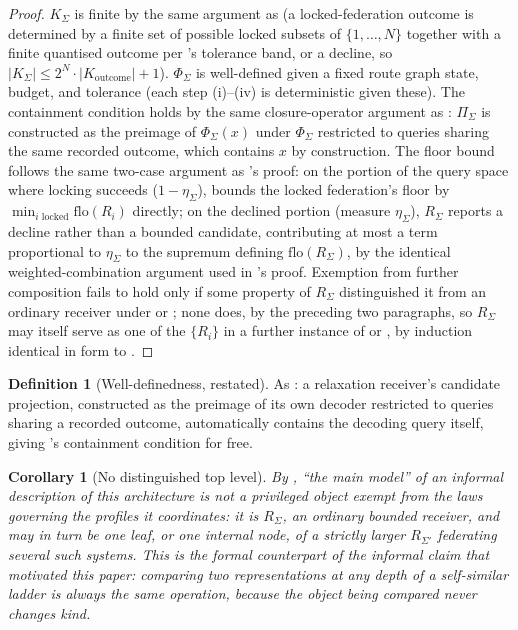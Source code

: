 \documentclass[11pt,twocolumn,a4paper]{article}
\theoremstyle{rdm}
\newtheorem{corollary}[theorem]{Corollary}
\theoremstyle{definition}
\newtheorem{definition}[theorem]{Definition}
\theoremstyle{remark}
\newcommand{\Know}{K}
\newcommand{\flo}{\mathrm{flo}}
\newcommand{\Rec}{R}
\begin{document}
\begin{proof}
$\Know_\Sigma$ is finite by the same argument as
 (a locked-federation outcome is determined by a
finite set of possible locked subsets of $\{1,\dots,N\}$ together with a
finite quantised outcome per 's tolerance band,
or a decline, so $|\Know_\Sigma|\le 2^N\cdot|\Know_{\mathrm{outcome}}|+1$).
$\Phi_\Sigma$ is well-defined given a fixed route graph state, budget, and
tolerance (each step (i)--(iv) is deterministic given these). The
containment condition holds by the same closure-operator argument as
: $\Pi_\Sigma$ is constructed as the preimage
of $\Phi_\Sigma(x)$ under $\Phi_\Sigma$ restricted to queries sharing the
same recorded outcome, which contains $x$ by construction. The floor bound
follows the same two-case argument as 's proof:
on the portion of the query space where locking succeeds
($1-\eta_\Sigma$),  bounds the locked
federation's floor by $\min_{i\text{ locked}}\flo(\Rec_i)$ directly; on the
declined portion (measure $\eta_\Sigma$), $\Rec_\Sigma$ reports a decline
rather than a bounded candidate, contributing at most a term proportional
to $\eta_\Sigma$ to the supremum defining $\flo(\Rec_\Sigma)$, by the
identical weighted-combination argument used in
's proof. Exemption from further composition
fails to hold only if some property of $\Rec_\Sigma$ distinguished it from
an ordinary receiver under  or
; none does, by the preceding two paragraphs, so
$\Rec_\Sigma$ may itself serve as one of the $\{\Rec_i\}$ in a further
instance of  or , by
induction identical in form to
\citet[Cor.~9.1]{sachikonye-accountable-compilation}.
\end{proof}

\begin{definition}[Well-definedness, restated]
\label{prop:relax-welldef-recap}
As \citet[Prop.~9.1]{sachikonye-accountable-compilation}: a relaxation
receiver's candidate projection, constructed as the preimage of its own
decoder restricted to queries sharing a recorded outcome, automatically
contains the decoding query itself, giving 's
containment condition for free.
\end{definition}

\begin{corollary}[No distinguished top level]
\label{cor:no-top}
By , ``the main model'' of an informal description of this
architecture is not a privileged object exempt from the laws governing the
profiles it coordinates: it is $\Rec_\Sigma$, an ordinary bounded receiver,
and may in turn be one leaf, or one internal node, of a strictly larger
$\Rec_{\Sigma'}$ federating several such systems. This is the formal
counterpart of the informal claim that motivated this paper: comparing two
representations at any depth of a self-similar ladder is always the same
operation, because the object being compared never changes kind.
\end{corollary}
\end{document}
